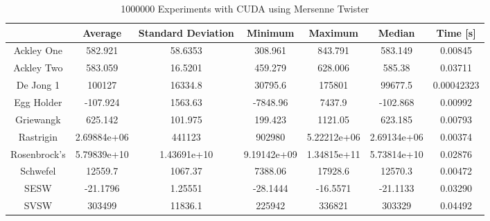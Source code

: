 \documentclass{article}
\begin{document}
	\begin{table}[h]
        \begin{centering}
            \begin{tabular}{|c||c|c|c|c|c|c|}
                \hline
                            & Average & Standard Deviation & Minimum & Maximum & Median & Time [s] \\
                \hline
                \hline
                Ackley One & 582.921 & 58.6353 & 308.961 & 843.791 & 583.149 & 0.00845 \\
                \hline
                Ackley Two & 583.059 & 16.5201 & 459.279 & 628.006 & 585.38 & 0.03711 \\
                \hline
                De Jong 1 & 100127 & 16334.8 & 30795.6 & 175801 & 99677.5 & 0.00042323\\
                \hline
                Egg Holder & -107.924 & 1563.63 & -7848.96 & 7437.9 & -102.868 & 0.00992 \\
                \hline
                Griewangk & 625.142 & 101.975 & 199.423 & 1121.05 & 623.185 & 0.00793 \\
                \hline
                Rastrigin & 2.69884e+06 & 441123 & 902980 & 5.22212e+06 & 2.69134e+06 & 0.00374 \\
                \hline
                Rosenbrock's & 5.79839e+10 & 1.43691e+10 & 9.19142e+09 & 1.34815e+11 & 5.73814e+10 & 0.02876 \\
                \hline
                Schwefel & 12559.7 & 1067.37 & 7388.06 & 17928.6 & 12570.3 & 0.00472\\
                \hline
                SESW & -21.1796 & 1.25551 & -28.1444 & -16.5571 & -21.1133 & 0.03290 \\
                \hline
                SVSW & 303499 & 11836.1 & 225942 & 336821 & 303329 & 0.04492 \\
                \hline
            \end{tabular}
            \caption{1000000 Experiments with CUDA using Mersenne Twister}
        \end{centering}
        \end{table}
\end{document}

